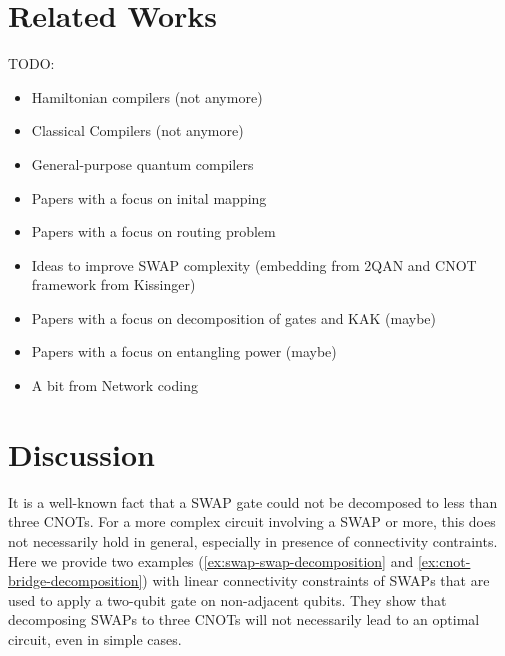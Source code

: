 \documentclass{report}
\begin{document}
\chapter{Related Works}\label{chap:related_works}

TODO:
\begin{itemize}
  \item Hamiltonian compilers (not anymore) \cite{lao2021,campbell2019,childs2021}
  \item Classical Compilers (not anymore)
  \item General-purpose quantum compilers \cite{cross2022,sivarajah2021,qiskit2023,maronese2021}
  \item Papers with a focus on inital mapping \cite{siraichi2018,zhang2021,paler2019}
  \item Papers with a focus on routing problem \cite{childs,zhou2020,itoko2019,cowtan2019}
  \item Ideas to improve SWAP complexity (embedding from 2QAN and CNOT framework from Kissinger) \cite{lao2021}\cite{nash2020,kissinger2019}
  \item Papers with a focus on decomposition of gates and KAK (maybe) \cite{tucci2005,vatan2004a}
  \item Papers with a focus on entangling power (maybe) \cite{nielsen2003,berry2002,bennett2002,linowski2020}
  \item A bit from Network coding \cite{ho2008}
\end{itemize}


\chapter{Discussion}\label{chap:discussion}

It is a well-known fact that a SWAP gate could not be decomposed to less than three CNOTs. For a more complex circuit involving a SWAP or more, this does not necessarily hold in general, especially in presence of connectivity contraints. Here we provide two examples (\ref{ex:swap-swap-decomposition} and \ref{ex:cnot-bridge-decomposition}) with linear connectivity constraints of SWAPs that are used to apply a two-qubit gate on non-adjacent qubits.
They show that decomposing SWAPs to three CNOTs will not necessarily lead to an optimal circuit, even in simple cases.
\end{document}
